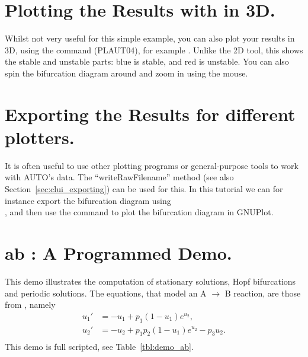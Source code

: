 \documentclass[12pt]{report}
\begin{document}
\section{ Plotting the Results with \AUTO in 3D.}
Whilst not very useful for this simple example, you can also plot
your results in 3D, using the  command ({\cal PLAUT04}), for example
. Unlike the 2D tool, this shows the stable and
unstable parts: blue is stable, and red is unstable. You can also
spin the bifurcation diagram around and zoom in using the mouse.

\section{ Exporting the Results for different plotters.}
It is often useful to use other plotting programs or general-purpose
tools to work with AUTO's data. The ``writeRawFilename'' method (see
also Section~\ref{sec:clui_exporting}) can be used for this.
In this tutorial we can for
instance export the bifurcation diagram using\\
, and then use
the command  to plot
the bifurcation diagram in GNUPlot.

\newpage
\section{ ab : A Programmed Demo.} \label{sec:Demos_ab}
This demo illustrates the computation of 
stationary solutions,
Hopf bifurcations 
and 
periodic solutions.
The equations, that model an A $\to$ B  reaction, are those from
 \citeyear{URP:74}, namely
\begin{equation} \begin{array}{cl}
  u_1 ' &=  -u_1 + p_1 (1-u_1) e^{u_2}, \\
  u_2 ' &=  -u_2 +  p_1 p_2 ( 1-u_1) e^{u_2} - p_3 u_2.\\
\end{array} \end{equation}
This demo is full scripted, see Table~\ref{tbl:demo_ab}.
\end{document}
